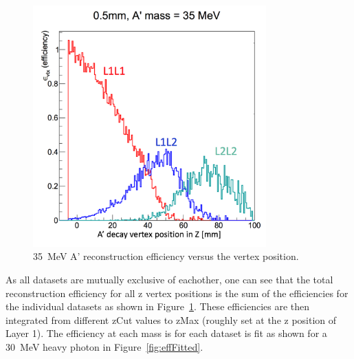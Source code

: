 \begin{figure}[H]
  \centering
      \includegraphics[width=0.8\textwidth]{plots/35MeV_apEff.png}
      \caption{35~MeV A' reconstruction efficiency versus the vertex position.}
  \label{fig:apEff}
\end{figure} 

As all datasets are mutually exclusive of eachother, one can see that the total reconstruction efficiency for all z vertex positions is the sum of the efficiencies for the individual datasets as shown in Figure~\ref{fig:apEff}. These efficiencies are then integrated from different zCut values to zMax (roughly set at the z position of Layer 1). The efficiency at each mass is for each dataset is fit as shown for a 30~MeV heavy photon in Figure~\ref{fig:effFitted}.

